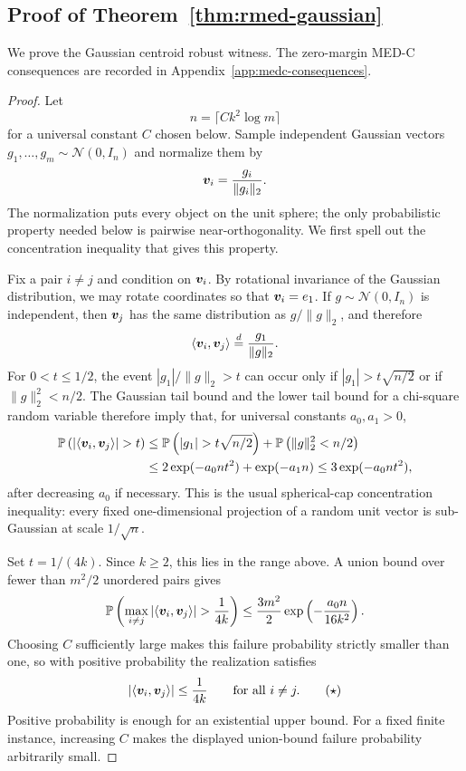 \documentclass{article}
\begin{document}
\subsection{Proof of Theorem~\ref{thm:rmed-gaussian}}\label{app:proof:thm:rmed-gaussian}

We prove the Gaussian centroid robust witness. The zero-margin MED-C consequences are recorded in Appendix~\ref{app:medc-consequences}.

\begin{proof}
Let
\[
    n=\lceil Ck^2\log m\rceil
\]
for a universal constant $C$ chosen below. Sample independent Gaussian
vectors $g_1,\dots,g_m\sim\mathcal{N}(0,I_n)$ and normalize them by
\[
    \bm{v}_i=\frac{g_i}{\|g_i\|_2}.
\]
The normalization puts every object on the unit sphere; the only
probabilistic property needed below is pairwise near-orthogonality. We
first spell out the concentration inequality that gives this property.

Fix a pair $i\ne j$ and condition on $\bm{v}_i$. By rotational invariance
of the Gaussian distribution, we may rotate coordinates so that
$\bm{v}_i=e_1$. If $g\sim\mathcal{N}(0,I_n)$ is independent, then
$\bm{v}_j$ has the same distribution as $g/\|g\|_2$, and therefore
\[
    \langle \bm{v}_i,\bm{v}_j\rangle
    \stackrel{d}{=}
    \frac{g_1}{\|g\|_2}.
\]
For $0<t\le 1/2$, the event $|g_1|/\|g\|_2>t$ can occur only if
$|g_1|>t\sqrt{n/2}$ or if $\|g\|_2^2<n/2$. The Gaussian tail bound and
the lower tail bound for a chi-square random variable therefore imply
that, for universal constants $a_0,a_1>0$,
\[
\begin{aligned}
    \mathbb{P}\left(|\langle \vv_i,\vv_j\rangle|>t\right)
    &\le
    \mathbb{P}\left(|g_1|>t\sqrt{n/2}\right)
    +\mathbb{P}\left(\|g\|_2^2<n/2\right) \\
    &\le
    2\exp(-a_0nt^2)+\exp(-a_1n)
    \le
    3\exp(-a_0nt^2),
\end{aligned}
\]
after decreasing $a_0$ if necessary. This is the usual spherical-cap
concentration inequality: every fixed one-dimensional projection of a
random unit vector is sub-Gaussian at scale $1/\sqrt{n}$.

Set $t=1/(4k)$. Since $k\ge2$, this lies in the range above. A union
bound over fewer than $m^2/2$ unordered pairs gives
\[
    \mathbb{P}\left(
    \max_{i\ne j}|\langle \vv_i,\vv_j\rangle|>\frac{1}{4k}
    \right)
    \le
    \frac{3m^2}{2}\exp\left(-\frac{a_0n}{16k^2}\right).
\]
Choosing $C$ sufficiently large makes this failure probability strictly
smaller than one, so with positive probability the realization satisfies
\[
    |\langle \bm{v}_i,\bm{v}_j\rangle|
    \le
    \frac{1}{4k}
    \qquad\text{for all }i\ne j.
    \tag{$\star$}
\]
Positive probability is enough for an existential upper bound. For a
fixed finite instance, increasing $C$ makes the displayed union-bound
failure probability arbitrarily small.


\end{proof}
\end{document}
